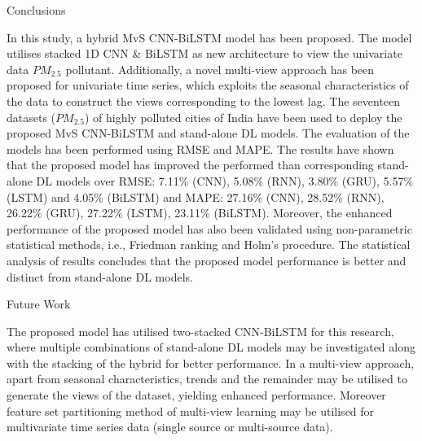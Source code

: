 \documentclass[12pt, aspectratio=169]{beamer}
\begin{document}
\begin{frame}{Conclusions}
	\begin{block}{}
		\footnotesize {In this study, a hybrid MvS CNN-BiLSTM model has been proposed. The model utilises stacked 1D CNN \& BiLSTM as new architecture to view the univariate data $PM_{2.5}$ pollutant. Additionally, a novel multi-view approach has been proposed for univariate time series, which exploits the seasonal characteristics of the data to construct the views corresponding to the lowest lag. The seventeen datasets ($PM_{2.5}$) of highly polluted cities of India have been used to deploy the proposed MvS CNN-BiLSTM and stand-alone DL models. The evaluation of the models has been performed using RMSE and MAPE. The results have shown that the proposed model has improved the performed than corresponding stand-alone DL models over RMSE:  7.11\% (CNN), 5.08\% (RNN), 3.80\% (GRU), 5.57\% (LSTM) and 4.05\% (BiLSTM) and MAPE: 27.16\% (CNN), 28.52\% (RNN), 26.22\% (GRU), 27.22\% (LSTM), 23.11\% (BiLSTM). Moreover, the enhanced performance of the proposed model has also been validated using non-parametric statistical methods, i.e., Friedman ranking and Holm's procedure. The statistical analysis of results concludes that the proposed model performance is better and distinct from stand-alone DL models.}
	\end{block}
\end{frame}

\begin{frame}{Future Work}
	\begin{block}{}
		The proposed model has utilised two-stacked CNN-BiLSTM for this research, where multiple combinations of stand-alone DL models may be investigated along with the stacking of the hybrid for better performance. In a multi-view approach, apart from seasonal characteristics, trends and the remainder may be utilised to generate the views of the dataset, yielding enhanced performance. Moreover feature set partitioning method of multi-view learning may be utilised for multivariate time series data (single source or multi-source data).
	\end{block}
\end{frame}


\end{document}
